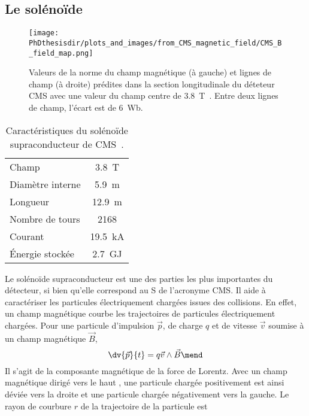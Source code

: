 \subsection{Le solénoïde}\label{chapter-LHC-section-CMS-subsec-solenoide}
\begin{figure}[b]
\centering
\texttt{[image: \\PhDthesisdir/plots\_and\_images/from\_CMS\_magnetic\_field/CMS\_B\_field\_map.png]}
\caption[Champ magnétique dans le détecteur CMS.]{Valeurs de la norme du champ magnétique (à gauche) et lignes de champ (à droite) prédites dans la section longitudinale du déteteur CMS avec une valeur du champ centre de \SI{3.8}{\tesla}~\cite{CMS_magnetic_field}. Entre deux lignes de champ, l'écart est de \SI{6}{\weber}.}
\label{fig-chapter-LHC-section-CMS-subsec-solenoide-CMS_B_field_map}
\end{figure}
\begin{wraptable}{R}{6cm}
\centering
\begin{tabular}{lc}
\toprule
Champ & \SI{3.8}{\tesla}\\
Diamètre interne & \SI{5.9}{\meter}\\
Longueur & \SI{12.9}{\meter}\\
Nombre de tours & \num{2168}\\
Courant & \SI{19.5}{\kilo\ampere}\\
Énergie stockée & \SI{2.7}{\giga\joule}\\
\bottomrule
\end{tabular}
\caption[Caractéristiques du solénoïde supraconducteur de CMS.]{Caractéristiques du solénoïde supraconducteur de CMS~\cite{CMS_TDR_1}.}
\label{tab-solenoid_properties}
\end{wraptable}
Le solénoïde supraconducteur est une des parties les plus importantes du détecteur, si bien qu'elle correspond au \og S \fg{} de l'acronyme CMS.
Il aide à caractériser les particules électriquement chargées issues des collisions.
En effet, un champ magnétique courbe les trajectoires de particules électriquement chargées.
Pour une particule d'impulsion $\vec{p}$, de charge $q$ et de vitesse $\vec{v}$ soumise à un champ magnétique $\vec{B}$,
\begin{equation}
\dv{\vec{p}}{t} = q \vec{v} \wedge \vec{B}
\mend
\end{equation}
Il s'agit de la composante magnétique de la force de Lorentz.
Avec un champ magnétique dirigé \og vers le haut \fg, une particule chargée positivement est ainsi déviée vers la droite et une particule chargée négativement vers la gauche.
Le rayon de courbure $r$ de la trajectoire de la particule est
